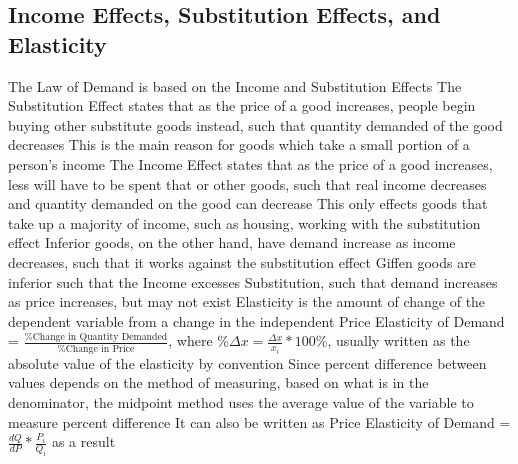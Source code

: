 \documentclass[11 pt, twoside]{article}
\newenvironment{outline*}
{
	\begin{outline}[enumerate]
	}
	{\end{outline}
}
\begin{document}
\subsection{Income Effects, Substitution Effects, and Elasticity}
\begin{outline*}
\1 The Law of Demand is based on the Income and Substitution Effects
\1 The Substitution Effect states that as the price of a good increases, people begin buying other substitute goods instead, such that quantity demanded of the good decreases
\2 This is the main reason for goods which take a small portion of a person's income
\1 The Income Effect states that as the price of a good increases, less will have to be spent that or other goods, such that real income decreases and quantity demanded on the good can decrease
\2 This only effects goods that take up a majority of income, such as housing, working with the substitution effect
\2 Inferior goods, on the other hand, have demand increase as income decreases, such that it works against the substitution effect
\3 Giffen goods are inferior such that the Income excesses Substitution, such that demand increases as price increases, but may not exist
\1 Elasticity is the amount of change of the dependent variable from a change in the independent
\2 Price Elasticity of Demand = $\frac{\text{\% Change in Quantity Demanded}}{\text{\% Change in Price}}$, where $\% \Delta x = \frac{\Delta x}{x_i} * 100\%$, usually written as the absolute value of the elasticity by convention
\2 Since percent difference between values depends on the method of measuring, based on what is in the denominator, the midpoint method uses the average value of the variable to measure percent difference
\3 It can also be written as Price Elasticity of Demand = $\frac{dQ}{dP} * \frac{P_i}{Q_i}$ as a result
\end{outline*}
\end{document}
